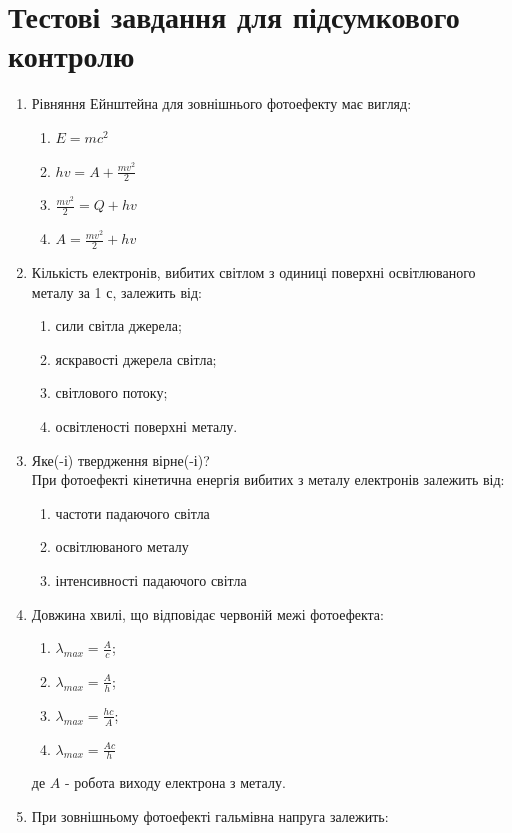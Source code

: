 \documentclass[twocolumn]{el-author}
\begin{document}
\newpage

\section{Тестові завдання для підсумкового контролю}

\begin{enumerate}
	\item Рівняння Ейнштейна для зовнішнього фотоефекту має вигляд:
	\begin{enumerate}
		\item $E = mc^{2}$
		\item $hv = A + \frac{mv^{2}}{2}$
		\item $\frac{mv^{2}}{2} = Q + hv$
		\item $A = \frac{mv^{2}}{2} + hv$
	\end{enumerate}
	\item Кількість електронів, вибитих світлом 
		з одиниці поверхні освітлюваного металу за 1 с, залежить від:
	\begin{enumerate}
		\item сили світла джерела;
		\item яскравості джерела світла;
		\item світлового потоку;
		\item освітленості поверхні металу.
	\end{enumerate}
	\item Яке(-і) твердження вірне(-і)? \\
		При фотоефекті кінетична енергія вибитих з металу 
		електронів залежить від:
	\begin{enumerate}
		\item частоти падаючого світла
		\item освітлюваного металу
		\item інтенсивності падаючого світла
	\end{enumerate}
	\item Довжина хвилі, що відповідає червоній межі фотоефекта:
	\begin{enumerate}
		\item $\lambda_{max} = \frac{A}{c}$;
		\item $\lambda_{max} = \frac{A}{h}$;
		\item $\lambda_{max} = \frac{hc}{A}$;
		\item $\lambda_{max} = \frac{Ac}{h}$
	\end{enumerate}
		де $A$ - робота виходу електрона з металу.
	\item При зовнішньому фотоефекті гальмівна напруга залежить:

\end{enumerate}
\end{document}
